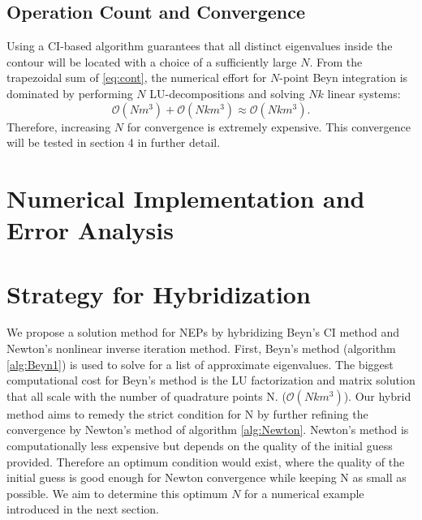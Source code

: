 \documentclass[final,leqno,onefignum,onetabnum]{siamltex1213}
\begin{document}
\subsection{Operation Count and Convergence}
Using a CI-based algorithm guarantees that all distinct eigenvalues inside the contour will be located with a choice of a sufficiently large $N$. From the trapezoidal sum of \ref{eq:cont}, the numerical effort for $N$-point Beyn integration is dominated by performing $N$ LU-decompositions and solving $Nk$ linear systems:
\begin{equation}
\mathcal{O}(N m^3) + \mathcal{O}(N k m^3)\approx \mathcal{O}(Nkm^3).
\end{equation}
Therefore, increasing $N$ for convergence is extremely expensive. This convergence will be tested in section 4 in further detail. 
\section{Numerical Implementation and Error Analysis }

\section{Strategy for Hybridization}
We propose a solution method for NEPs by hybridizing Beyn's CI method and Newton's nonlinear inverse iteration method. First, Beyn's method (algorithm \ref{alg:Beyn1}) is used to solve for a list of approximate eigenvalues. The biggest computational cost for Beyn's method is the LU factorization and matrix solution that all scale with the number of quadrature points N. ($\mathcal{O}(Nkm^3)$). Our hybrid method aims to remedy the strict condition for N by further refining the convergence by Newton's method of algorithm \ref{alg:Newton}. Newton's method is computationally less expensive but depends on the quality of the initial guess provided. Therefore an optimum condition would exist, where the quality of the initial guess is good enough for Newton convergence while keeping N as small as possible. We aim to determine this optimum $N$ for a numerical example introduced in the next section. 
\end{document}
